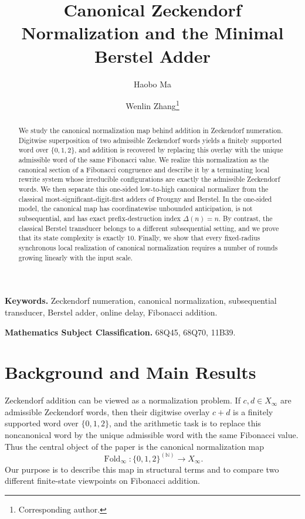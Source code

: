 \documentclass[11pt,letterpaper]{article}
\title{Canonical Zeckendorf Normalization and the Minimal Berstel Adder}
\author[1]{Haobo Ma}
\author[2]{Wenlin Zhang\thanks{Corresponding author.}}
\affil[1]{AELF PTE LTD., \#14-02, Marina Bay Financial Centre Tower 1, 8 Marina Blvd, Singapore 018981, Singapore\\\texttt{auric@aelf.io}}
\affil[2]{National University of Singapore, Singapore\\\texttt{e1327962@u.nus.edu}}
\date{}
\numberwithin{equation}{section}
\theoremstyle{plain}
\theoremstyle{definition}
\theoremstyle{remark}
\newcommand{\NN}{\mathbb{N}}
\newcommand{\Xinf}{X_\infty}
\DeclareMathOperator{\Fold}{Fold}
\begin{document}
\maketitle

\begin{abstract}
We study the canonical normalization map behind addition in Zeckendorf
numeration.  Digitwise superposition of two admissible Zeckendorf words yields
a finitely supported word over $\{0,1,2\}$, and addition is recovered by
replacing this overlay with the unique admissible word of the same Fibonacci
value.  We realize this normalization as the canonical section of a Fibonacci
congruence and describe it by a terminating local rewrite system whose
irreducible configurations are exactly the admissible Zeckendorf words.  We
then separate this one-sided low-to-high canonical normalizer from the
classical most-significant-digit-first adders of Frougny and Berstel.  In the
one-sided model, the canonical map has coordinatewise unbounded anticipation,
is not subsequential, and has exact prefix-destruction index $\Delta(n)=n$.
By contrast, the classical Berstel transducer belongs to a different
subsequential setting, and we prove that its state complexity is exactly $10$.
Finally, we show that every fixed-radius synchronous local realization of
canonical normalization requires a number of rounds growing linearly with the
input scale.
\end{abstract}

\medskip
\noindent\textbf{Keywords.}
Zeckendorf numeration, canonical normalization, subsequential transducer,
Berstel adder, online delay, Fibonacci addition.

\medskip
\noindent\textbf{Mathematics Subject Classification.}
68Q45, 68Q70, 11B39.

\section{Background and Main Results}

Zeckendorf addition can be viewed as a normalization problem.  If
$c,d\in\Xinf$ are admissible Zeckendorf words, then their digitwise overlay
$c+d$ is a finitely supported word over $\{0,1,2\}$, and the arithmetic task
is to replace this noncanonical word by the unique admissible word with the
same Fibonacci value.  Thus the central object of the paper is the canonical
normalization map
\[
\Fold_\infty:\{0,1,2\}^{(\NN)}\to \Xinf.
\]
Our purpose is to describe this map in structural terms and to compare two
different finite-state viewpoints on Fibonacci addition.
\end{document}
